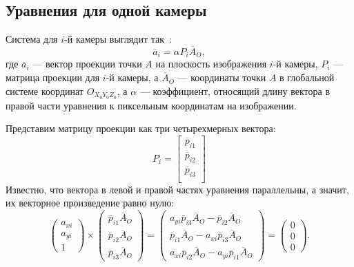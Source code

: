 \documentclass[12pt, a4paper]{article}
\begin{document}
\subsection{Уравнения для одной камеры}
Система для $i$-й камеры выглядит так~\cite{multiview_cv, dlt_temugeb}:
\begin{equation}
    \overline{a}_i = \alpha P_i \overline{A}_O,
\label{eqn:general_dlt}
\end{equation}
где $\overline{a}_i$ --- вектор проекции точки $A$ на плоскость изображения
$i$-й камеры, $P_i$ --- матрица проекции для $i$-й камеры, а $\overline{A}_O$
--- координаты точки $A$ в глобальной системе координат $O_{X_0Y_0Z_0}$, а
$\alpha$ --- коэффициент, относящий длину вектора в правой части уравнения к
пиксельным координатам на изображении.

 Представим матрицу проекции как три четырехмерных вектора:
\begin{equation}
    P_i = \begin{bmatrix}
        \overline{p}_{i1}\\
        \overline{p}_{i2}\\
        \overline{p}_{i3}\\
    \end{bmatrix}
\end{equation}
Известно, что вектора в левой и правой частях уравнения параллельны, а значит,
их векторное произведение равно нулю:
\begin{equation}
    \begin{pmatrix}
        a_{xi}\\
        a_{yi}\\
        1
    \end{pmatrix} \times \begin{pmatrix}
        \overline{p}_{i1} \overline{A}_O\\
        \overline{p}_{i2} \overline{A}_O\\
        \overline{p}_{i3} \overline{A}_O
    \end{pmatrix} = \begin{pmatrix}
        a_{yi} \overline{p}_{i3} \overline{A}_O - \overline{p}_{i2} \overline{A}_O\\
        \overline{p}_{i1} \overline{A}_O - a_{xi} \overline{p}_{i3} \overline{A}_O\\
        a_{xi} \overline{p}_{i2} \overline{A}_O - a_{yi} \overline{p}_{i1} \overline{A}_O
    \end{pmatrix} = \begin{pmatrix}
        0\\
        0\\
        0
    \end{pmatrix}.
\label{eqn:full_cross_product}
\end{equation}
\end{document}
